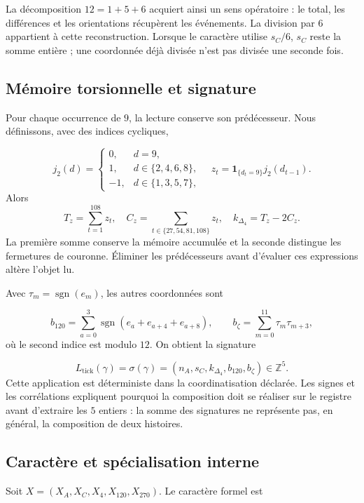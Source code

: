 La décomposition \(12=1+5+6\) acquiert ainsi un sens opératoire :
le total, les différences et les orientations récupèrent les événements.
La division par \(6\) appartient à cette reconstruction. Lorsque le caractère
utilise \(s_C/6\), \(s_C\) reste la somme entière ; une coordonnée déjà
divisée n’est pas divisée une seconde fois.


\subsection{Mémoire torsionnelle et signature
}

Pour chaque occurrence de \(9\), la lecture conserve son prédécesseur.
Nous définissons, avec des indices cycliques,

\[
 j_2(d)=\begin{cases}0,&d=9,\\1,&d\in\{2,4,6,8\},\\-1,&d\in\{1,3,5,7\},\end{cases}
 \quad z_t=\mathbf1_{\{d_t=9\}}j_2(d_{t-1}).
\]
Alors
\[
 T_z=\sum_{t=1}^{108}z_t,\quad
 C_z=\sum_{t\in\{27,54,81,108\}}z_t,\quad
 k_{\Delta_4}=T_z-2C_z.
\]
La première somme conserve la mémoire accumulée et la seconde distingue les
fermetures de couronne. Éliminer les prédécesseurs avant d’évaluer ces
expressions altère l’objet lu.


Avec \(\tau_m=\operatorname{sgn}(e_m)\), les autres coordonnées sont

\[
 b_{120}=\sum_{a=0}^{3}\operatorname{sgn}(e_a+e_{a+4}+e_{a+8}),
 \qquad b_{\zeta}=\sum_{m=0}^{11}\tau_m\tau_{m+3},
\]
où le second indice est modulo \(12\). On obtient la signature

\[
 L_{\mathrm{tick}}(\gamma)
 =\sigma(\gamma)=(n_A,s_C,k_{\Delta_4},b_{120},b_{\zeta})\in\mathbb Z^5.
\]
Cette application est déterministe dans la coordinatisation déclarée. Les signes et les
corrélations expliquent pourquoi la composition doit se réaliser sur le
registre avant d’extraire les \(5\) entiers : la somme des signatures ne
représente pas, en général, la composition de deux histoires.




\subsection{Caractère et spécialisation interne
}

Soit \(X=(X_A,X_C,X_4,X_{120},X_{270})\). Le caractère formel est

